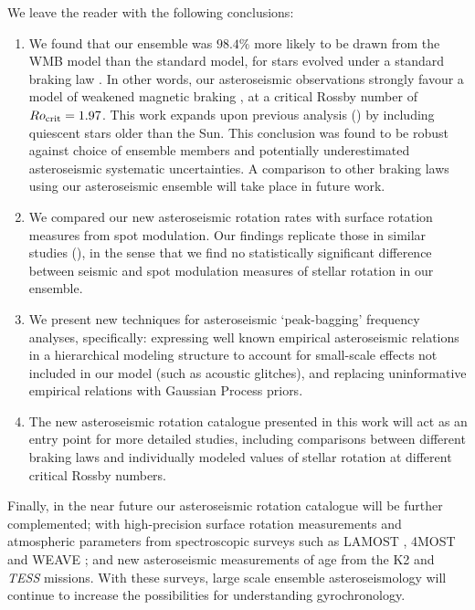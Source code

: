 \documentclass[12pt]{article}
\newcommand{\tess}{\emph{TESS}\xspace}
\newcommand{\ktwo}{K2\xspace}
\begin{document}
We leave the reader with the following conclusions:
\begin{enumerate}
	\item We found that our ensemble was $98.4\%$ more likely to be drawn from the WMB model than the standard model, for stars evolved under a standard braking law \cite{vansaders+pinsonneault2013}. In other words, our asteroseismic observations strongly favour a model of weakened magnetic braking \cite{vansaders+2016}, at a critical Rossby number of $Ro_{\rm{crit}} = 1.97$. This work expands upon previous analysis (\cite{vansaders+2019}) by including quiescent stars older than the Sun. This conclusion was found to be robust against choice of ensemble members and potentially underestimated asteroseismic systematic uncertainties. A comparison to other braking laws \cite{matt+2015} using our asteroseismic ensemble will take place in future work.
	
	\item We compared our new asteroseismic rotation rates with surface rotation measures from spot modulation. Our findings replicate those in similar studies (\cite{nielsen+2015,benomar+2015}), in the sense that we find no statistically significant difference between seismic and spot modulation measures of stellar rotation in our ensemble.
	
	\item We present new techniques for asteroseismic `peak-bagging' frequency analyses, specifically: expressing well known empirical asteroseismic relations in a hierarchical modeling structure to account for small-scale effects not included in our model (such as acoustic glitches), and replacing uninformative empirical relations with Gaussian Process priors.
	
	\item The new asteroseismic rotation catalogue presented in this work will act as an entry point for more detailed studies, including comparisons between different braking laws and individually modeled values of stellar rotation at different critical Rossby numbers.
\end{enumerate}

Finally, in the near future our asteroseismic rotation catalogue will be further complemented; with high-precision surface rotation measurements and atmospheric parameters from spectroscopic surveys such as LAMOST \cite{deng+2012}, 4MOST \cite{dejong+2014} and WEAVE \cite{dalton+2014}; and new asteroseismic measurements of age from the \ktwo and \tess missions. With these surveys, large scale ensemble asteroseismology will continue to increase the possibilities for understanding gyrochronology.\\
\end{document}
